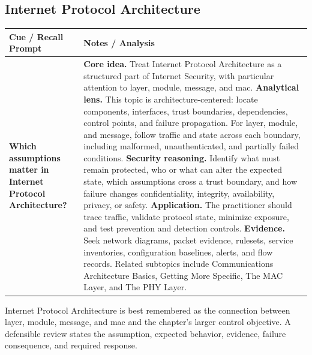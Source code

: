 \documentclass[11pt]{article}
\newcommand{\CornellHeader}{%
\rowcolor{Navy}\color{white}\bfseries Cue / Recall Prompt & \color{white}\bfseries Notes / Analysis\\\hline}
\newcommand{\CornellRow}[2]{%
\cellcolor{CueGray}\RaggedRight\textbf{#1} & \RaggedRight #2\\\hline}
\begin{document}
\subsection*{Internet Protocol Architecture}
\begin{longtable}{>{\RaggedRight\arraybackslash}p{}|>{\RaggedRight\arraybackslash}p{}}
\CornellHeader
\CornellRow{Which assumptions matter in Internet Protocol Architecture?}{\textbf{Core idea.} Treat Internet Protocol Architecture as a structured part of Internet Security, with particular attention to layer, module, message, and mac. \textbf{Analytical lens.} This topic is architecture-centered: locate components, interfaces, trust boundaries, dependencies, control points, and failure propagation. For layer, module, and message, follow traffic and state across each boundary, including malformed, unauthenticated, and partially failed conditions. \textbf{Security reasoning.} Identify what must remain protected, who or what can alter the expected state, which assumptions cross a trust boundary, and how failure changes confidentiality, integrity, availability, privacy, or safety. \textbf{Application.} The practitioner should trace traffic, validate protocol state, minimize exposure, and test prevention and detection controls. \textbf{Evidence.} Seek network diagrams, packet evidence, rulesets, service inventories, configuration baselines, alerts, and flow records. Related subtopics include Communications Architecture Basics, Getting More Specific, The MAC Layer, and The PHY Layer.}
\end{longtable}
\begin{topicsummary}
Internet Protocol Architecture is best remembered as the connection between layer, module, message, and mac and the chapter's larger control objective. A defensible review states the assumption, expected behavior, evidence, failure consequence, and required response.
\end{topicsummary}
\end{document}
